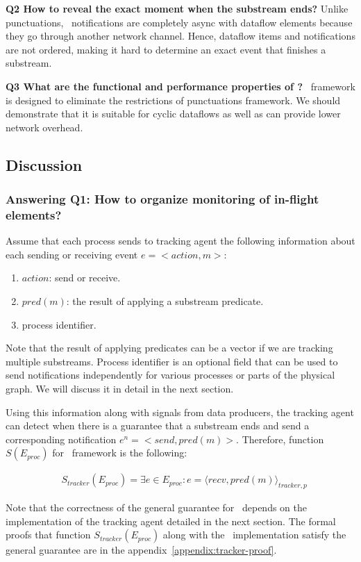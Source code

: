 {\bf Q2 How to reveal the exact moment when the substream ends?} Unlike punctuations, \tracker\ notifications are completely async with dataflow elements because they go through another network channel. Hence, dataflow items and notifications are not ordered, making it hard to determine an exact event that finishes a substream.

{\bf Q3 What are the functional and performance properties of \tracker?} \tracker\ framework is designed to eliminate the restrictions of punctuations framework. We should demonstrate that it is suitable for cyclic dataflows as well as can provide lower network overhead.

\subsection{Discussion}

\subsubsection{Answering Q1: How to organize monitoring of in-flight elements?}
Assume that each process sends to tracking agent the following information about each sending or receiving event $e = <action,m>$:
\begin{enumerate}
    \item $action$: send or receive.
    \item $pred(m)$: the result of applying a substream predicate.
    \item process identifier.
\end{enumerate}

Note that the result of applying predicates can be a vector if we are tracking multiple substreams. Process identifier is an optional field that can be used to send notifications independently for various processes or parts of the physical graph. We will discuss it in detail in the next section.

Using this information along with signals from data producers, the tracking agent can detect when there is a guarantee that a substream ends and send a corresponding notification $e^{n} = <send,pred(m)>$. Therefore, function $S(E_{proc})$ for \tracker\ framework is the following:

\begin{align*}
& S_{tracker}(E_{proc}) = \exists e \in E_{proc} : e = \langle recv,pred(m)\rangle_{tracker,p}
\end{align*}

Note that the correctness of the general guarantee for \tracker\ depends on the implementation of the tracking agent detailed in the next section. The formal proofs that function $S_{tracker}(E_{proc})$ along with the \tracker\ implementation satisfy the general guarantee are in the appendix~\ref{appendix:tracker-proof}.

